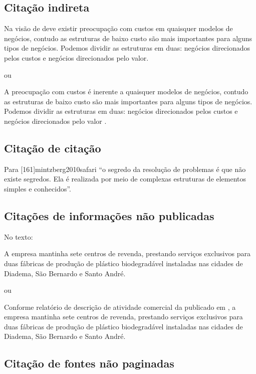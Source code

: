 \subsection{Citação indireta}

Na visão de \textcite{osterwalder2011business} deve existir preocupação
com custos em quaisquer modelos de negócios, contudo as estruturas de baixo
custo são mais importantes para alguns tipos de negócios. Podemos dividir as
estruturas em duas: negócios direcionados pelos custos e negócios direcionados
pelo valor.

ou

A preocupação com custos é inerente a quaisquer modelos de negócios, contudo
as estruturas de baixo custo são mais importantes para alguns tipos de negócios.
Podemos dividir as estruturas em duas: negócios direcionados pelos custos e negócios
direcionados pelo valor \parencite{osterwalder2011business}.

\subsection{Citação de citação}

Para [161]{mintzberg2010safari}  “o segredo da
resolução de problemas é que não existe segredos. Ela é realizada por meio de
complexas estruturas de elementos simples e conhecidos”.

\subsection{Citações de informações não publicadas}

No texto:

A empresa mantinha sete centros de revenda, prestando serviços exclusivos para duas
fábricas de produção de plástico biodegradável instaladas nas cidades de Diadema, São
Bernardo e Santo André.

ou

Conforme relatório de descrição de atividade comercial da  \citeauthor{biolife2008}
publicado em , a empresa mantinha sete centros de revenda,
prestando serviços exclusivos para duas fábricas de produção de plástico biodegradável
instaladas nas cidades de Diadema, São Bernardo e Santo André.

\subsection{Citação de fontes não paginadas}

